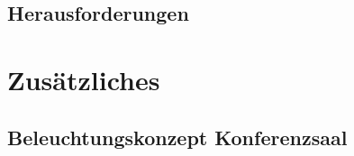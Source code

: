 \documentclass[
    headings=optiontotocandhead,%
    oneside,
    numbers=noenddot,%
    toc=flat, %
    12pt, %
    titlepage, %
    parskip=full, %
    listof=totoc, %
    listof=flat, %
    numbers=noenddot, %
    bibliography=totoc, %
    a4paper,DIV=14,
    BCOR=15mm,
]{scrbook}
\begin{document}
\renewcommand{\kapitelautor}{Autor: Dominik Nußbaumer}

    

\section{Herausforderungen}\label{Herausforderungen}

\renewcommand{\kapitelautor}{Autor: Dominik Nußbaumer}

    

\chapter{Zusätzliches}\label{Zusätzliches}



% 

\section{Beleuchtungskonzept Konferenzsaal}\label{Beleuchtungskonzept-Konferenzsaal}

\renewcommand{\kapitelautor}{Autor: Florian Steiner}







\end{document}
